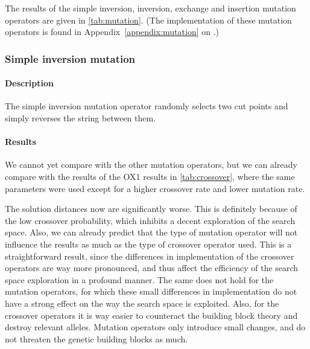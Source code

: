 ﻿\documentclass[a4paper,english,11pt,]{scrartcl}
\begin{document}
The results of the simple inversion, inversion, exchange and insertion mutation operators are given in \autoref{tab:mutation}.
(The implementation of these mutation operators is found in Appendix~\ref{appendix:mutation} on .)
% 



\subsubsection{Simple inversion mutation}
\paragraph{Description}

% 

The simple inversion mutation operator randomly selects two cut points and simply reverses the string between them.

\paragraph{Results}
We cannot yet compare with the other mutation operators, but we can already compare with the results of the OX1 results in \autoref{tab:crossover}, where the same parameters were used except for a higher crossover rate and lower mutation rate.   

The solution distances now are significantly worse. This is definitely because of the low crossover probability, which inhibits a decent exploration of the search space. Also, we can already predict that the type of mutation operator will not influence the results as much as the type of crossover operator used. This is a straightforward result, since the differences in implementation of the crossover operators are way more pronounced, and thus affect the efficiency of the search space exploration in a profound manner. The same does not hold for the mutation operators, for which these small differences in implementation do not have a strong effect on the way the search space is exploited. Also, for the crossover operators it is way easier to counteract the building block theory and destroy relevant alleles. Mutation operators only introduce small changes, and do not threaten the genetic building blocks as much.    
\end{document}
